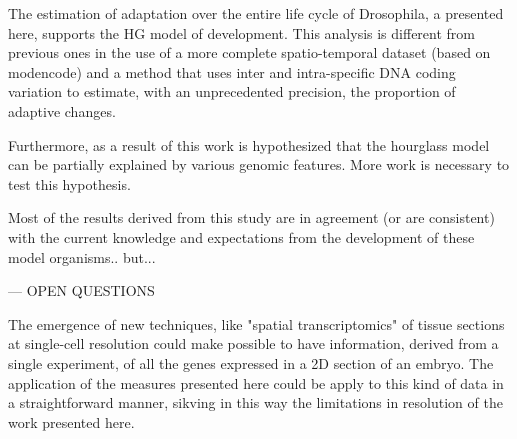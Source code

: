 The estimation of adaptation over the entire life cycle of Drosophila, a presented here, supports the HG model of development. This analysis is different from previous ones in the use of a more complete spatio-temporal dataset (based on modencode) and a method that uses inter and intra-specific DNA coding variation to estimate, with an unprecedented precision, the proportion of adaptive changes.

Furthermore, as a result of this work is hypothesized that the hourglass model can be partially explained by various genomic features. More work is necessary to test this hypothesis.


Most of the results derived from this study are in agreement (or are consistent) with the current knowledge and expectations from the development of these model organisms.. but...

---
OPEN QUESTIONS

The emergence of new techniques, like "spatial transcriptomics" of tissue sections at single-cell resolution could make possible to have information, derived from a single experiment, of all the genes expressed in a 2D section of an embryo. The application of the measures presented here could be apply to this kind of data in a straightforward manner, sikving in this way the limitations in resolution of the work presented here.

